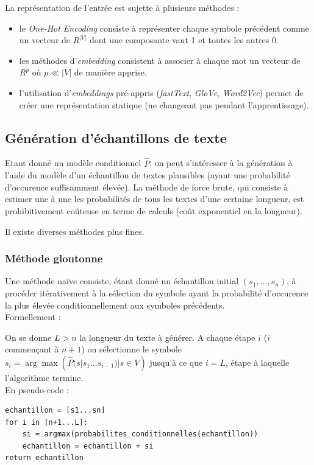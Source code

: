 La représentation de l'entrée est sujette à plusieurs méthodes :
\begin{itemize}
  \item le \textit{One-Hot Encoding} consiste à représenter chaque symbole précédent comme un vecteur de $R^{\vert V \vert}$ dont une composante vaut 1 et toutes les autres 0.
  \item les méthodes d'\textit{embedding} consistent à associer à chaque mot un vecteur de $R^p$ où $p \ll \vert V\vert$ de manière apprise.
  \item l'utilisation d'\textit{embeddings} pré-appris (\textit{fastText}, \textit{GloVe}, \textit{Word2Vec}) permet de créer une représentation statique (ne changeant pas pendant l'apprentissage).
\end{itemize}

\subsection{Génération d'échantillons de texte}

Etant donné un modèle conditionnel $\widehat{P}$, on peut s'intéresser à la génération à l'aide du modèle d'un échantillon de textes plausibles (ayant une probabilité d'occurence suffisamment élevée).
La méthode de force brute, qui consiste à estimer une à une les probabilités de tous les textes d'une certaine longueur, est prohibitivement coûteuse en terme de calculs (coût exponentiel en la longueur).

Il existe diverses méthodes plus fines.

\subsubsection{Méthode gloutonne}
Une méthode naïve consiste, étant donné un échantillon initial $(s_1,\ldots,s_n)$, à procéder itérativement à la sélection du symbole ayant la probabilité d'occurence la plus élevée conditionnellement aux symboles précédents. \\

Formellement :

On se donne $L>n$ la longueur du texte à générer.
A chaque étape $i$ ($i$ commençant à $n+1$) on sélectionne le symbole $s_i = \arg\max({\widehat{P}(s|s_1\ldots s_{i-1}) | s \in V})$ jusqu'à ce que $i=L$, étape à laquelle l'algorithme termine. \\

En pseudo-code :

\begin{verbatim}
echantillon = [s1...sn]
for i in [n+1...L]:
    si = argmax(probabilites_conditionnelles(echantillon))
    echantillon = echantillon + si
return echantillon
\end{verbatim}


